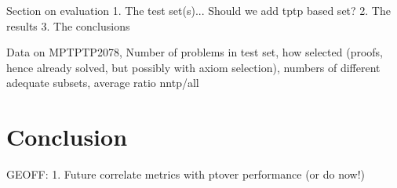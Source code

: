 \documentclass[EPiC]{easychair}
\begin{document}
Section on evaluation
1. The test set(s)... Should we add tptp based set?
2. The results
3. The conclusions

Data on MPTPTP2078, Number of problems in test set, how selected (proofs,
hence already solved, but possibly with axiom selection), numbers of
different adequate subsets, average ratio nntp/all

\section{Conclusion}
\label{Conclusion}

GEOFF:
1. Future correlate metrics with ptover performance (or do now!)

\label{sect:bib}


\end{document}
